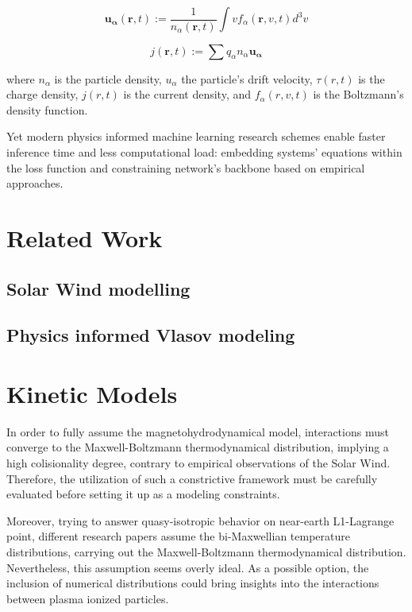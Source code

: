 \documentclass[12pt]{article}
\begin{document}
\begin{equation}
    \mathbf{u_{\alpha}} (\mathbf{r}, t) := \frac{1}{n_{\alpha}(\mathbf{r}, t)} \int v f_{\alpha}(\mathbf{r}, v, t) d^3v
\end{equation}

\begin{equation}
    j(\mathbf{r}, t) := \sum q_{\alpha} n_{\alpha} \mathbf{u_{\alpha}}
\end{equation}

where $n_{\alpha}$ is the particle density, $u_{\alpha}$ the particle's drift velocity, $\tau(r, t)$ is the charge density, $j(r, t)$ is the current density, and $f_{\alpha}(r, v, t)$ is the Boltzmann's density function.

Yet modern physics informed machine learning research schemes enable faster inference time and less computational load: embedding systems' equations within the loss function and constraining network's backbone based on empirical approaches.

\section{Related Work}

\subsection{Solar Wind modelling}

\subsection{Physics informed Vlasov modeling}


\section{Kinetic Models}
In order to fully assume the magnetohydrodynamical model, interactions must converge to the Maxwell-Boltzmann thermodynamical distribution, implying a high colisionality degree, contrary to empirical observations of the Solar Wind. Therefore, the utilization of such a constrictive framework must be carefully evaluated before setting it up as a modeling constraints.

Moreover, trying to answer quasy-isotropic behavior on near-earth L1-Lagrange point, different research papers assume the bi-Maxwellian temperature distributions, carrying out the Maxwell-Boltzmann thermodynamical distribution. Nevertheless, this assumption seems overly ideal. As a possible option, the inclusion of numerical distributions could bring insights into the interactions between plasma ionized particles.
\end{document}
